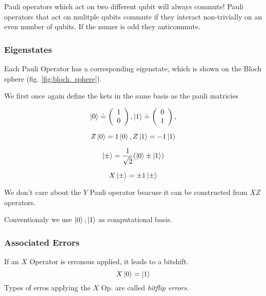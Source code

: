 Pauli operators which act on two different qubit will always commute!
Pauli operators that act on mulitple qubits commute if they interact non-trivially on an even number of qubits.
If the numer is odd they anticommute.


\subsubsection{Eigenstates}
Each Pauli Operator has a corresponding eigenstate, which is shown on the Bloch sphere (fig. \ref{fig:bloch_sphere}).

We first once again define the kets in the same basis as the pauli matricies

\begin{equation}
   \ket{0}  \doteq  \left(\begin{array}{c} 1 \\ 0 \end{array}\right), \ket{1} \doteq \left(\begin{array}{c} 0 \\ 1 \end{array}\right),
\end{equation}

\begin{equation}
    Z \ket{0} = 1 \ket{0}, Z \ket{1} = -1 \ket{1}
\end{equation}

\begin{equation}
    \ket{\pm}  =  \frac{1}{\sqrt{2}}( \ket{0} \pm  \ket{1}) 
\end{equation}

\begin{equation}
   X \ket{\pm} = \pm1 \ket{\pm} 
\end{equation}

We don't care about the $Y$ Pauli operator beacuse it can be constructed from $XZ$ operators.

Conventionaly we use $\ket{0},\ket{1}$ as computational basis.


\subsubsection{Associated Errors}
If an $X$ Operator is erronous applied, it leads to a bitshift. 
\begin{equation}
    X\ket{0} = \ket{1}
\end{equation}
Types of erros applying the $X$ Op. are called \textit{bitflip errors}.

